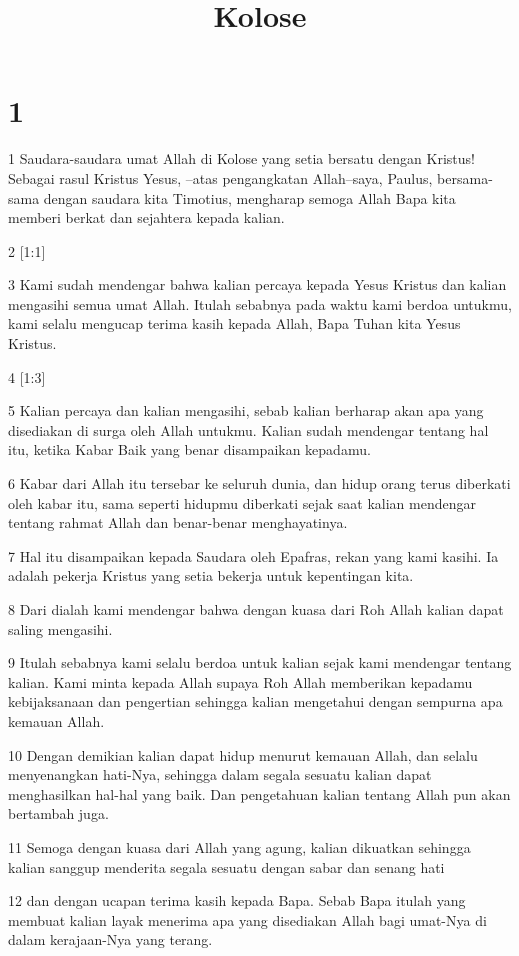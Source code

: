 

\title{Kolose}


\chapter{1}

\par 1 Saudara-saudara umat Allah di Kolose yang setia bersatu dengan Kristus! Sebagai rasul Kristus Yesus, --atas pengangkatan Allah--saya, Paulus, bersama-sama dengan saudara kita Timotius, mengharap semoga Allah Bapa kita memberi berkat dan sejahtera kepada kalian.
\par 2 [1:1]
\par 3 Kami sudah mendengar bahwa kalian percaya kepada Yesus Kristus dan kalian mengasihi semua umat Allah. Itulah sebabnya pada waktu kami berdoa untukmu, kami selalu mengucap terima kasih kepada Allah, Bapa Tuhan kita Yesus Kristus.
\par 4 [1:3]
\par 5 Kalian percaya dan kalian mengasihi, sebab kalian berharap akan apa yang disediakan di surga oleh Allah untukmu. Kalian sudah mendengar tentang hal itu, ketika Kabar Baik yang benar disampaikan kepadamu.
\par 6 Kabar dari Allah itu tersebar ke seluruh dunia, dan hidup orang terus diberkati oleh kabar itu, sama seperti hidupmu diberkati sejak saat kalian mendengar tentang rahmat Allah dan benar-benar menghayatinya.
\par 7 Hal itu disampaikan kepada Saudara oleh Epafras, rekan yang kami kasihi. Ia adalah pekerja Kristus yang setia bekerja untuk kepentingan kita.
\par 8 Dari dialah kami mendengar bahwa dengan kuasa dari Roh Allah kalian dapat saling mengasihi.
\par 9 Itulah sebabnya kami selalu berdoa untuk kalian sejak kami mendengar tentang kalian. Kami minta kepada Allah supaya Roh Allah memberikan kepadamu kebijaksanaan dan pengertian sehingga kalian mengetahui dengan sempurna apa kemauan Allah.
\par 10 Dengan demikian kalian dapat hidup menurut kemauan Allah, dan selalu menyenangkan hati-Nya, sehingga dalam segala sesuatu kalian dapat menghasilkan hal-hal yang baik. Dan pengetahuan kalian tentang Allah pun akan bertambah juga.
\par 11 Semoga dengan kuasa dari Allah yang agung, kalian dikuatkan sehingga kalian sanggup menderita segala sesuatu dengan sabar dan senang hati
\par 12 dan dengan ucapan terima kasih kepada Bapa. Sebab Bapa itulah yang membuat kalian layak menerima apa yang disediakan Allah bagi umat-Nya di dalam kerajaan-Nya yang terang.
